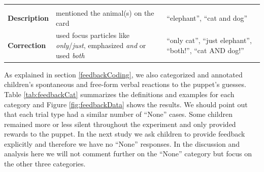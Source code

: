 \documentclass[floatsintext,man]{apa6}
\theoremstyle{definition}
\theoremstyle{definition}
\theoremstyle{definition}
\theoremstyle{remark}
\begin{document}
\begin{longtable}[]{@{}lll@{}}
\begin{minipage}[t]{0.31\columnwidth}
\end{minipage}\tabularnewline
\begin{minipage}[t]{0.15\columnwidth}\raggedright\strut
\textbf{Description}\strut
\end{minipage} & \begin{minipage}[t]{0.45\columnwidth}\raggedright\strut
mentioned the animal(s) on the card\strut
\end{minipage} & \begin{minipage}[t]{0.31\columnwidth}\raggedright\strut
\enquote{elephant}, \enquote{cat and dog}\strut
\end{minipage}\tabularnewline
\begin{minipage}[t]{0.15\columnwidth}\raggedright\strut
\textbf{Correction}\strut
\end{minipage} & \begin{minipage}[t]{0.45\columnwidth}\raggedright\strut
used focus particles like \emph{only}/\emph{just}, emphasized \emph{and}
or used \emph{both}\strut
\end{minipage} & \begin{minipage}[t]{0.31\columnwidth}\raggedright\strut
\enquote{only cat}, \enquote{just elephant}, \enquote{both!},
\enquote{cat AND dog!}\strut
\end{minipage}\tabularnewline
\bottomrule
\end{longtable}

As explained in section \ref{feedbackCoding}, we also categorized and
annotated children's spontaneous and free-form verbal reactions to the
puppet's guesses. Table \ref{tab:feedbackCat} summarizes the definitions
and examples for each category and Figure \ref{fig:feedbackData} shows
the results. We should point out that each trial type had a similar
number of \enquote{None} cases. Some children remained more or less
silent throughout the experiment and only provided rewards to the
puppet. In the next study we ask children to provide feedback explicitly
and therefore we have no \enquote{None} responses. In the discussion and
analysis here we will not comment further on the \enquote{None} category
but focus on the other three categories.
\end{document}

